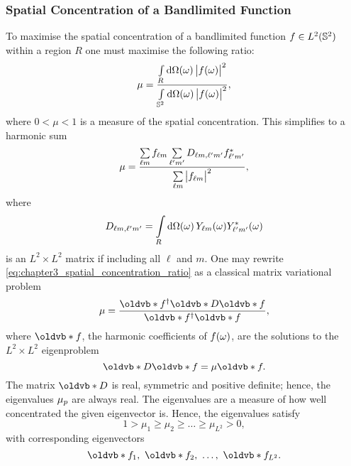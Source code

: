 

\subsubsection{Spatial Concentration of a Bandlimited Function}

To maximise the spatial concentration of a bandlimited function \(f \in \hilbert{\twoSphere}\) within a region \(R\) one must maximise the following ratio:
%
\begin{equation}
	\mu
	= \frac{\integrateRegion{\sphereVolume} \abs{\pixel{f}}^{2}}{\integrateSphere{\omega} \abs{\pixel{f}}^{2}},
\end{equation}
%
where \(0 < \mu < 1\) is a measure of the spatial concentration.
This simplifies to a harmonic sum
%
\begin{equation}\label{eq:chapter3_spatial_concentration_ratio}
	\mu
	= \frac{\harmonicSum \harmonic{f} \harmonicSum['] \Dmatrix \conj{\harmonic[']{f}}}{\harmonicSum \abs{\harmonic{f}}^{2}},
\end{equation}
%
where
%
\begin{equation}
	\Dmatrix
	= \integrateRegion{\sphereVolume} \pixel{\harmonic{Y}} \pixel{\conj{\harmonic[']{Y}}}
\end{equation}
%
is an \(L^{2} \times{} L^{2}\) matrix if including all \(\ell{}\) and \(m\).
One may rewrite \cref{eq:chapter3_spatial_concentration_ratio} as a classical matrix variational problem
%
\begin{equation}
	\mu
	= \frac{\vb{f}^{\dagger} \vb{D} \vb{f}}{\vb{f}^{\dagger}\vb{f}},
\end{equation}
%
where \(\vb{f}\), the harmonic coefficients of \(\pixel{f}\), are the solutions to the \(L^{2} \times{} L^{2}\) eigenproblem
%
\begin{equation}\label{eq:chapter3_eigenproblem}
	\vb{D}\vb{f}
	= \mu\vb{f}.
\end{equation}
%
The matrix \(\vb{D}\) is real, symmetric and positive definite; hence, the eigenvalues \(\slepian{\mu}\) are always real.
The eigenvalues are a measure of how well concentrated the given eigenvector is.
Hence, the eigenvalues satisfy
%
\begin{equation}
	1 > \mu_{1} \geq \mu_{2} \geq \ldots \geq \mu_{L^{2}} > 0, %
\end{equation}
%
with corresponding eigenvectors
%
\begin{equation}
	\vb{f}_{1},\ \vb{f}_{2},\ \ldots,\ \vb{f}_{L^{2}}.
\end{equation}
